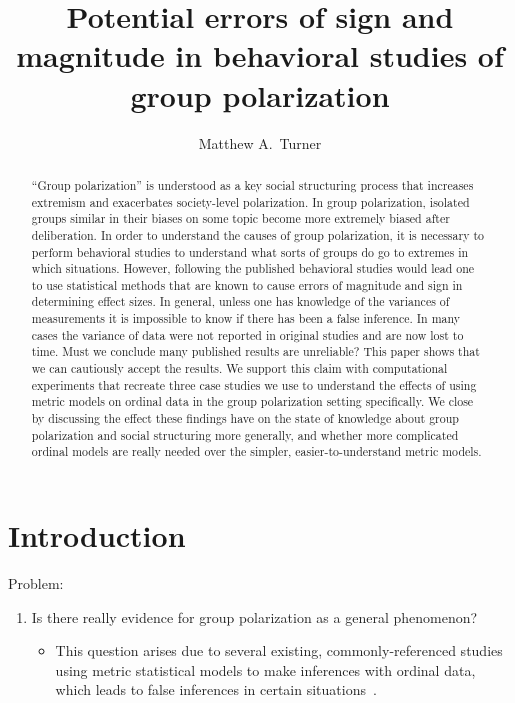 \documentclass[11pt,letterpaper]{article}
\title{Potential errors of sign and magnitude in behavioral studies of group polarization}
\author{{Matthew A.~Turner}}
\begin{document}
\maketitle

\begin{abstract}
  ``Group polarization'' is understood as a key social structuring process
  that increases extremism and exacerbates society-level polarization. 
  In group polarization,
  isolated groups similar in their biases on some topic become more extremely biased after
  deliberation. In order to understand the causes of group polarization, it is 
  necessary to perform behavioral studies to understand what sorts of groups
  do go to extremes in which situations. However, following the published
  behavioral studies would lead one to use statistical methods that are known
  to cause errors of magnitude and sign in determining effect sizes. 
  In general, unless one has knowledge of the variances of measurements it is
  impossible to know if there has been a false inference. In many cases
  the variance of data were not reported in original studies and are now
  lost to time. Must we conclude many published results are unreliable? 
  This paper shows that we can cautiously accept the results. We support
  this claim with computational experiments that recreate three case studies
  we use to understand the effects of using metric models on ordinal data
  in the group polarization setting specifically. We close by discussing the
  effect these findings have on the state of knowledge about group polarization
  and social structuring more generally, and whether more complicated ordinal
  models are really needed over the simpler, easier-to-understand
  metric models.
\end{abstract}


\section{Introduction}

Problem:
\begin{enumerate}
  \item
    Is there really evidence for group polarization as a general phenomenon?
    \begin{itemize}
      \item 
        This question arises due to several existing, commonly-referenced
        studies using metric
        statistical models to make inferences with ordinal data, which leads
        to false inferences in certain situations~\cite{Liddell2018}.
    \end{itemize}
\end{enumerate}
\end{document}
